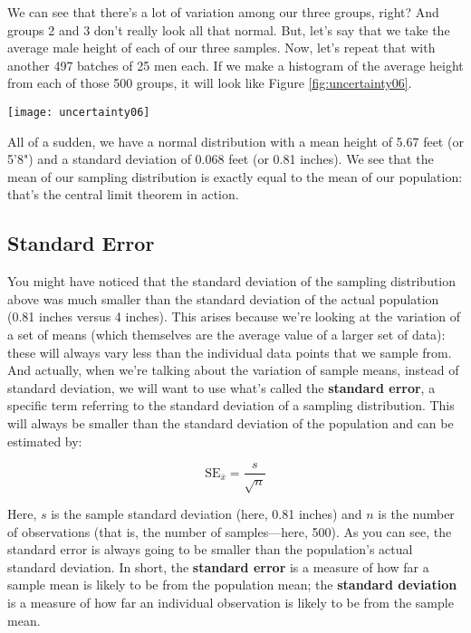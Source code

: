 We can see that there's a lot of variation among our three groups, right? And groups 2 and 3 don't really look all that normal. But, let's say that we take the average male height of each of our three samples. Now, let's repeat that with another 497 batches of 25 men each. If we make a histogram of the average height from each of those 500 groups, it will look like Figure \ref{fig:uncertainty06}.

\begin{figure*}[h!]
\texttt{[image: uncertainty06]}
\caption{Average height of 500 groups of randomly selected men}
\label{fig:uncertainty06}
\end{figure*}

All of a sudden, we have a normal distribution with a mean height of 5.67 feet (or 5'8") and a standard deviation of 0.068 feet (or 0.81 inches). We see that the mean of our sampling distribution is exactly equal to the mean of our population: that's the central limit theorem in action.

\subsection{Standard Error}

You might have noticed that the standard deviation of the sampling distribution above was much smaller than the standard deviation of the actual population (0.81 inches versus 4 inches). This arises because we're looking at the variation of a set of means (which themselves are the average value of a larger set of data): these will always vary less than the individual data points that we sample from. And actually, when we're talking about the variation of sample means, instead of standard deviation, we will want to use what's called the \textbf{standard error}, a specific term referring to the standard deviation of a sampling distribution. This will always be smaller than the standard deviation of the population and can be estimated by:

\begin{equation}
\text{SE}_{\bar{x}}= \frac{s}{\sqrt{n}}
\end{equation}

Here, \(s\)  is the sample standard deviation (here, 0.81 inches) and \(n\)  is the number of observations (that is, the number of samples---here, 500). As you can see, the standard error is always going to be smaller than the population's actual standard deviation. In short, the \textbf{standard error} is a measure of how far a sample mean is likely to be from the population mean; the \textbf{standard deviation} is a measure of how far an individual observation is likely to be from the sample mean.

